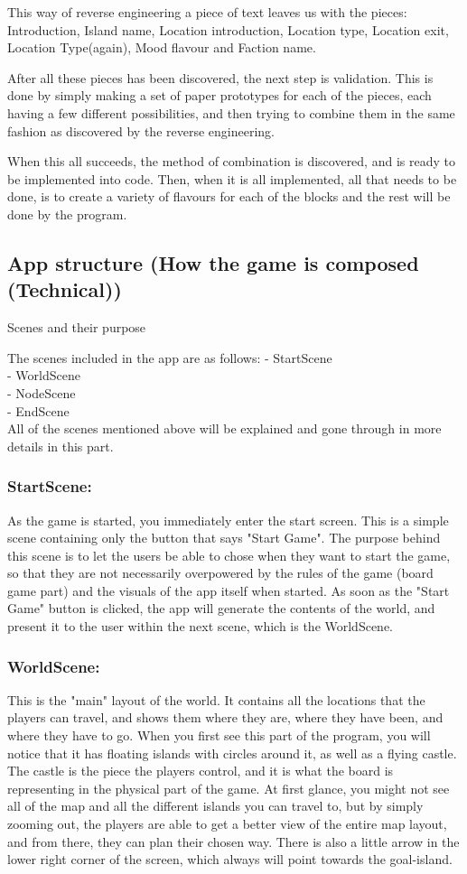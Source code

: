 This way of reverse engineering a piece of text leaves us with the pieces: Introduction, Island name, Location introduction, Location type, Location exit, Location Type(again), Mood flavour and Faction name.

After all these pieces has been discovered, the next step is validation. This is done by simply making a set of paper prototypes for each of the pieces, each having a few different possibilities, and then trying to combine them in the same fashion as discovered by the reverse engineering. 

When this all succeeds, the method of combination is discovered, and is ready to be implemented into code. Then, when it is all implemented, all that needs to be done, is to create a variety of flavours for each of the blocks and the rest will be done by the program.

\subsection{App structure (How the game is composed (Technical))}
Scenes and their purpose

The scenes included in the app are as follows:
- StartScene\\
- WorldScene\\
- NodeScene\\
- EndScene\\

All of the scenes mentioned above will be explained and gone through in more details in this part.
\subsubsection{StartScene:}
As the game is started, you immediately enter the start screen. This is a simple scene containing only the button that says "Start Game". The purpose behind this scene is to let the users be able to chose when they want to start the game, so that they are not necessarily overpowered by the rules of the game (board game part) and the visuals of the app itself when started.
As soon as the "Start Game" button is clicked, the app will generate the contents of the world, and present it to the user within the next scene, which is the WorldScene.
\subsubsection{WorldScene:}

This is the "main" layout of the world. It contains all the locations that the players can travel, and shows them where they are, where they have been, and where they have to go. When you first see this part of the program, you will notice that it has floating islands with circles around it, as well as a flying castle. The castle is the piece the players control, and it is what the board is representing in the physical part of the game.
At first glance, you might not see all of the map and all the different islands you can travel to, but by simply zooming out, the players are able to get a better view of the entire map layout, and from there, they can plan their chosen way. There is also a little arrow in the lower right corner of the screen, which always will point towards the goal-island. 

